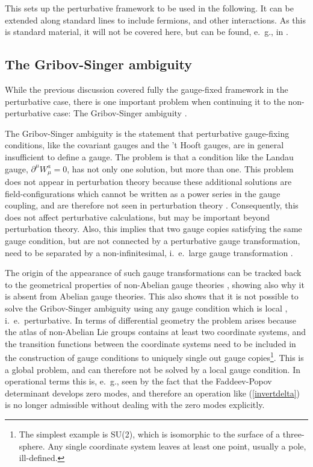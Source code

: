 \documentclass[final,12pt,3p,longtitle]{elsarticle}
\newcommand*{\pd}{\partial}
\newcommand*{\pref}[1]{(\ref{#1})}
\newcommand*{\1}{1\!\!\!\bot}
\begin{document}
This sets up the perturbative framework to be used in the following. It can be extended along standard lines to include fermions, and other interactions. As this is standard material, it will not be covered here, but can be found, e.\ g., in \cite{Bohm:2001yx,Barbieri:2007gi,O'Raifeartaigh:1986vq,Branco:2011iw,Langacker:1980js,Morrissey:2009tf}.

\subsection{The Gribov-Singer ambiguity}\label{ss:gribov}

While the previous discussion covered fully the gauge-fixed framework in the perturbative case, there is one important problem when continuing it to the non-perturbative case: The Gribov-Singer ambiguity \cite{Gribov:1977wm,Singer:1978dk,vanBaal:1997gu,vanBaal:1991zw,Dell'Antonio:1991xt,Maas:2011se,Vandersickel:2012tg,Sobreiro:2005ec}.

The Gribov-Singer ambiguity is the statement that perturbative gauge-fixing conditions, like the covariant gauges and the 't Hooft gauges, are in general insufficient to define a gauge. The problem is that a condition like the Landau gauge, $\pd^\mu W_\mu^a=0$, has not only one solution, but more than one. This problem does not appear in perturbation theory because these additional solutions are field-configurations which cannot be written as a power series in the gauge coupling, and are therefore not seen in perturbation theory \cite{Gribov:1977wm}. Consequently, this does not affect perturbative calculations, but may be important beyond perturbation theory. Also, this implies that two gauge copies satisfying the same gauge condition, but are not connected by a perturbative gauge transformation, need to be separated by a non-infinitesimal, i.\ e.\ large gauge transformation \cite{Gribov:1977wm}.

The origin of the appearance of such gauge transformations can be tracked back to the geometrical properties of non-Abelian gauge theories \cite{Singer:1978dk}, showing also why it is absent from Abelian gauge theories. This also shows that it is not possible to solve the Gribov-Singer ambiguity using any gauge condition which is local \cite{Singer:1978dk}, i.\ e.\ perturbative. In terms of differential geometry the problem arises because the atlas of non-Abelian Lie groups contains at least two coordinate systems, and the transition functions between the coordinate systems need to be included in the construction of gauge conditions to uniquely single out gauge copies\footnote{The simplest example is SU(2), which is isomorphic to the surface of a three-sphere. Any single coordinate system leaves at least one point, usually a pole, ill-defined.}. This is a global problem, and can therefore not be solved by a local gauge condition. In operational terms this is, e.\ g., seen by the fact that the Faddeev-Popov determinant develops zero modes, and therefore an operation like \pref{invertdelta} is no longer admissible without dealing with the zero modes explicitly.
\end{document}
